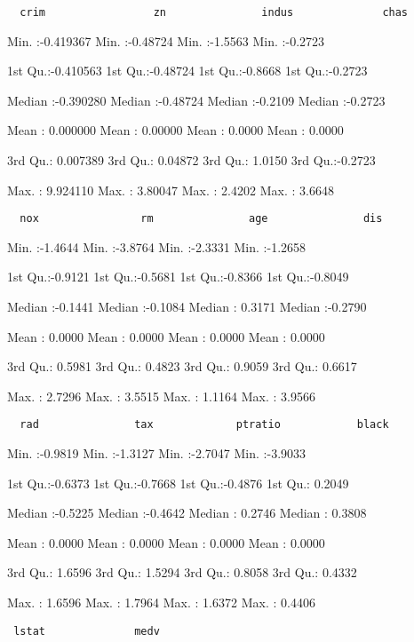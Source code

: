 \documentclass[]{article}
\begin{document}
\begin{verbatim}
  crim                 zn               indus              chas         
\end{verbatim}

Min. :-0.419367 Min. :-0.48724 Min. :-1.5563 Min. :-0.2723

1st Qu.:-0.410563 1st Qu.:-0.48724 1st Qu.:-0.8668 1st Qu.:-0.2723

Median :-0.390280 Median :-0.48724 Median :-0.2109 Median :-0.2723

Mean : 0.000000 Mean : 0.00000 Mean : 0.0000 Mean : 0.0000

3rd Qu.: 0.007389 3rd Qu.: 0.04872 3rd Qu.: 1.0150 3rd Qu.:-0.2723

Max. : 9.924110 Max. : 3.80047 Max. : 2.4202 Max. : 3.6648

\begin{verbatim}
  nox                rm               age               dis          
\end{verbatim}

Min. :-1.4644 Min. :-3.8764 Min. :-2.3331 Min. :-1.2658

1st Qu.:-0.9121 1st Qu.:-0.5681 1st Qu.:-0.8366 1st Qu.:-0.8049

Median :-0.1441 Median :-0.1084 Median : 0.3171 Median :-0.2790

Mean : 0.0000 Mean : 0.0000 Mean : 0.0000 Mean : 0.0000

3rd Qu.: 0.5981 3rd Qu.: 0.4823 3rd Qu.: 0.9059 3rd Qu.: 0.6617

Max. : 2.7296 Max. : 3.5515 Max. : 1.1164 Max. : 3.9566

\begin{verbatim}
  rad               tax             ptratio            black         
\end{verbatim}

Min. :-0.9819 Min. :-1.3127 Min. :-2.7047 Min. :-3.9033

1st Qu.:-0.6373 1st Qu.:-0.7668 1st Qu.:-0.4876 1st Qu.: 0.2049

Median :-0.5225 Median :-0.4642 Median : 0.2746 Median : 0.3808

Mean : 0.0000 Mean : 0.0000 Mean : 0.0000 Mean : 0.0000

3rd Qu.: 1.6596 3rd Qu.: 1.5294 3rd Qu.: 0.8058 3rd Qu.: 0.4332

Max. : 1.6596 Max. : 1.7964 Max. : 1.6372 Max. : 0.4406

\begin{verbatim}
 lstat              medv         
\end{verbatim}
\end{document}
